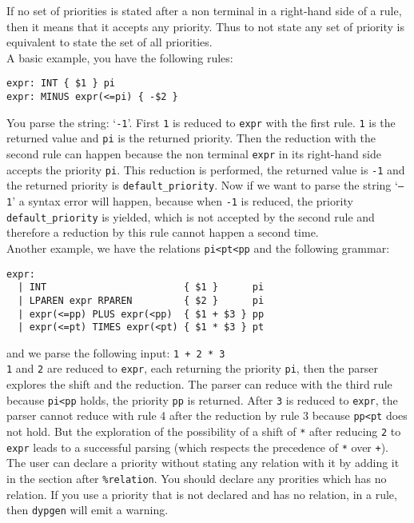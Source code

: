 \documentclass[12pt]{article}
\begin{document}
{If no set of priorities is stated after a non terminal in a right-hand side of a rule, then it means that it accepts any priority. Thus to not state any set of priority is equivalent to state the set of all priorities.\\

A basic example, you have the following rules:
\begin{verbatim}
expr: INT { $1 } pi
expr: MINUS expr(<=pi) { -$2 }
\end{verbatim}
You parse the string: `\texttt{-1}'. First \texttt{1} is reduced to \texttt{expr} with the first rule. \texttt{1} is the returned value and \texttt{pi} is the returned priority. Then the reduction with the second rule can happen because the non terminal \texttt{expr} in its right-hand side accepts the priority \texttt{pi}. This reduction is performed, the returned value is \texttt{-1} and the returned priority is \texttt{default\_priority}. Now if we want to parse the string `\texttt{--1}' a syntax error will happen, because when \texttt{-1} is reduced, the priority \texttt{default\_priority} is yielded, which is not accepted by the second rule and therefore a reduction by this rule cannot happen a second time.\\

Another example, we have the relations \texttt{pi<pt<pp} and the following grammar:
\begin{verbatim}
expr:
  | INT                        { $1 }      pi
  | LPAREN expr RPAREN         { $2 }      pi
  | expr(<=pp) PLUS expr(<pp)  { $1 + $3 } pp
  | expr(<=pt) TIMES expr(<pt) { $1 * $3 } pt
\end{verbatim}
and we parse the following input: \texttt{1 + 2 * 3}\\

\texttt{1} and \texttt{2} are reduced to \texttt{expr}, each returning the priority \texttt{pi}, then the parser explores the shift and the reduction.
The parser can reduce with the third rule because \texttt{pi<pp} holds, the priority \texttt{pp} is returned. After \texttt{3} is reduced to \texttt{expr}, the parser cannot reduce with rule 4 after the reduction by rule 3 because \texttt{pp<pt} does not hold.
But the exploration of the possibility of a shift of \texttt{*} after reducing \texttt{2} to \texttt{expr} leads to a successful parsing (which respects the precedence of \texttt{*} over \texttt{+}).\\

The user can declare a priority without stating any relation with it by adding it in the section after \texttt{\%relation}. You should declare any prorities which has no relation. If you use a priority that is not declared and has no relation, in a rule, then \texttt{dypgen} will emit a warning.\\

}
\end{document}
